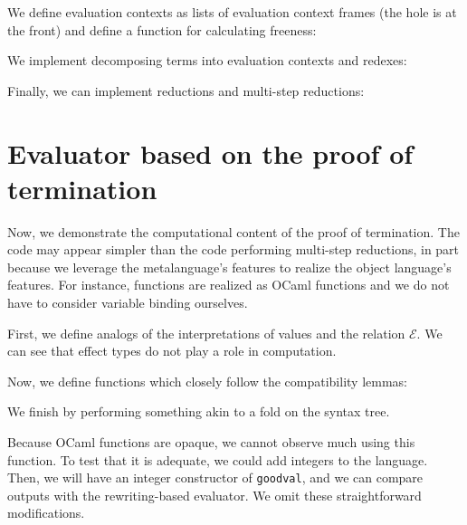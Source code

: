 \documentclass[a4paper, 11pt,titlepage, openright, twoside]{report}
\newcommand{\E}{\mathcal{E}}
\newcommand{\+}{\enspace}
\begin{document}




We define evaluation contexts as lists of evaluation context frames
(the hole is at the front)
and define a function for calculating freeness:



We implement decomposing terms into evaluation contexts and redexes:



Finally, we can implement reductions and multi-step reductions:





\section{Evaluator based on the proof of termination}

Now, we demonstrate the computational content of the proof of termination.
The code may appear simpler than the code performing multi-step reductions,
in part because we leverage
the metalanguage's features to realize the object language's features.
For instance, functions are realized as OCaml functions and
we do not have to consider variable binding ourselves.

First, we define analogs of the interpretations
of values and the relation $\E$.
We can see that effect types do not play a role in computation.



Now, we define functions which closely follow the compatibility lemmas:



We finish by performing something akin to a fold on the syntax tree.



Because OCaml functions are opaque,
we cannot observe much using this function.
To test that it is adequate,
we could add integers to the language.
Then, we will have an integer constructor of \texttt{goodval},
and we can compare outputs with the rewriting-based evaluator.
We omit these straightforward modifications.
\end{document}
